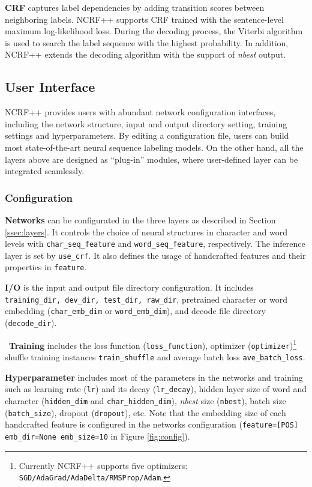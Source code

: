 \documentclass[11pt,a4paper]{article}
\begin{document}
\noindent \textbullet   \textbf{CRF} captures label dependencies by adding transition scores between neighboring labels. NCRF++ supports CRF trained with the sentence-level maximum log-likelihood loss. During the decoding process, the Viterbi algorithm is used to search the label sequence with the highest probability. In addition, NCRF++ extends the decoding algorithm with the support of \textit{nbest} output.

\subsection{User Interface}
NCRF++ provides users with abundant network configuration interfaces, including the network structure, input and output directory setting, training settings and hyperparameters. By editing a configuration file, users can build most state-of-the-art neural sequence labeling models. On the other hand, all the layers above are designed as ``plug-in'' modules, where user-defined layer can be integrated seamlessly.

\subsubsection{Configuration}
\noindent \textbullet  \textbf{Networks} can be configurated in the three layers as described in Section \ref{ssec:layers}. It controls the choice of neural structures in character and word levels with \texttt{char\_seq\_feature} and \texttt{word\_seq\_feature}, respectively. The inference layer is set by \texttt{use\_crf}. It also defines the usage of handcrafted features and their properties in \texttt{feature}. 

\noindent \textbullet  \textbf{I/O} is the input and output file directory configuration. It includes \texttt{training\_dir, dev\_dir, test\_dir, raw\_dir}, pretrained character or word embedding (\texttt{char\_emb\_dim} or \texttt{word\_emb\_dim}), and decode file directory (\texttt{decode\_dir}).

\noindent \textbullet \, \textbf{Training} includes the loss function (\texttt{loss\_function}), optimizer (\texttt{optimizer})\footnote{Currently NCRF++ supports five optimizers: \texttt{SGD/AdaGrad/AdaDelta/RMSProp/Adam}.} shuffle training instances \texttt{train\_shuffle} and average batch loss \texttt{ave\_batch\_loss}.

\noindent \textbullet  \textbf{Hyperparameter} includes most of the parameters in the networks and training such as learning rate (\texttt{lr}) and its decay (\texttt{lr\_decay}), hidden layer size of word and character (\texttt{hidden\_dim} and \texttt{char\_hidden\_dim}), \textit{nbest} size (\texttt{nbest}), batch size (\texttt{batch\_size}), dropout (\texttt{dropout}), etc. Note that the embedding size of each handcrafted feature is configured in the networks configuration (\texttt{feature=[POS] emb\_dir=None emb\_size=10} in Figure \ref{fig:config}).
\end{document}

